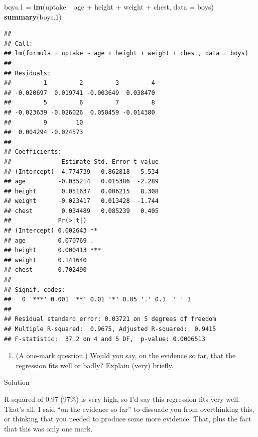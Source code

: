 \documentclass[]{tufte-book}
\newenvironment{Shaded}{}{}
\newcommand{\DataTypeTok}[1]{\textcolor[rgb]{0.56,0.13,0.00}{#1}}
\newcommand{\FloatTok}[1]{\textcolor[rgb]{0.25,0.63,0.44}{#1}}
\newcommand{\KeywordTok}[1]{\textcolor[rgb]{0.00,0.44,0.13}{\textbf{#1}}}
\newcommand{\NormalTok}[1]{#1}
\newcommand{\OperatorTok}[1]{\textcolor[rgb]{0.40,0.40,0.40}{#1}}
\newcommand{\StringTok}[1]{\textcolor[rgb]{0.25,0.44,0.63}{#1}}
\providecommand{\tightlist}{%
  \setlength{\itemsep}{0pt}\setlength{\parskip}{0pt}}
\theoremstyle{definition}
\theoremstyle{definition}
\theoremstyle{definition}
\theoremstyle{remark}
\begin{document}
\begin{Shaded}
\begin{Highlighting}[]
\NormalTok{boys}\FloatTok{.1}\NormalTok{ =}\StringTok{ }\KeywordTok{lm}\NormalTok{(uptake }\OperatorTok{~}\StringTok{ }\NormalTok{age }\OperatorTok{+}\StringTok{ }\NormalTok{height }\OperatorTok{+}\StringTok{ }\NormalTok{weight }\OperatorTok{+}\StringTok{ }\NormalTok{chest, }
    \DataTypeTok{data =}\NormalTok{ boys)}
\KeywordTok{summary}\NormalTok{(boys}\FloatTok{.1}\NormalTok{)}
\end{Highlighting}
\end{Shaded}

\begin{verbatim}
## 
## Call:
## lm(formula = uptake ~ age + height + weight + chest, data = boys)
## 
## Residuals:
##         1         2         3         4 
## -0.020697  0.019741 -0.003649  0.038470 
##         5         6         7         8 
## -0.023639 -0.026026  0.050459 -0.014380 
##         9        10 
##  0.004294 -0.024573 
## 
## Coefficients:
##              Estimate Std. Error t value
## (Intercept) -4.774739   0.862818  -5.534
## age         -0.035214   0.015386  -2.289
## height       0.051637   0.006215   8.308
## weight      -0.023417   0.013428  -1.744
## chest        0.034489   0.085239   0.405
##             Pr(>|t|)    
## (Intercept) 0.002643 ** 
## age         0.070769 .  
## height      0.000413 ***
## weight      0.141640    
## chest       0.702490    
## ---
## Signif. codes:  
##   0 '***' 0.001 '**' 0.01 '*' 0.05 '.' 0.1  ' ' 1
## 
## Residual standard error: 0.03721 on 5 degrees of freedom
## Multiple R-squared:  0.9675, Adjusted R-squared:  0.9415 
## F-statistic:  37.2 on 4 and 5 DF,  p-value: 0.0006513
\end{verbatim}

\begin{enumerate}
\def\labelenumi{(\alph{enumi})}
\setcounter{enumi}{2}
\tightlist
\item
  (A one-mark question.) Would you say, on the evidence so far, that the
  regression fits well or badly? Explain (very) briefly.
\end{enumerate}

Solution

R-squared of 0.97 (97\%) is very high, so I'd say this regression fits
very well. That's all. I said ``on the evidence so far'' to dissuade you
from overthinking this, or thinking that you needed to produce some more
evidence. That, plus the fact that this was only one mark.
\end{document}
